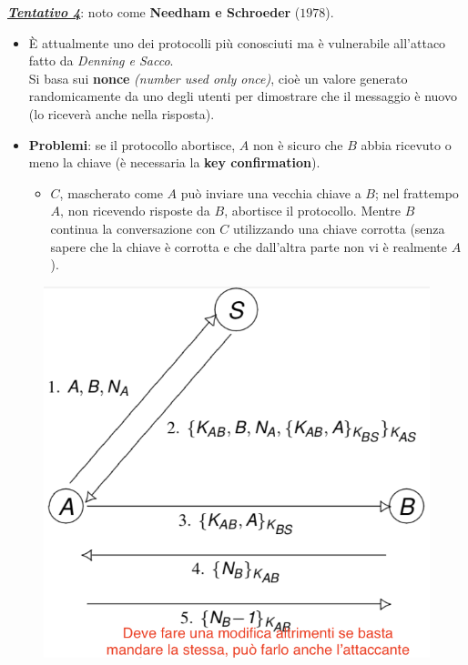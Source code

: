 \documentclass[11pt, a4paper, twoside, italian]{report}
\theoremstyle{plain}
\begin{document}
\begin{multicols}{2}
	\noindent
	\textbf{\textit{\underline{Tentativo 4}}}: noto come \textbf{Needham e Schroeder} ($1978$).
	\begin{itemize}
		\item È attualmente uno dei protocolli più conosciuti ma è vulnerabile all'attaco fatto da \textit{Denning e Sacco}.\\
		Si basa sui \textbf{nonce}\textit{ (number used only once)}, cioè un valore generato randomicamente da uno degli utenti per dimostrare che il messaggio è nuovo (lo riceverà anche nella risposta).
		\item \textbf{Problemi}: se il protocollo abortisce, $A$ non è sicuro che $B$ abbia ricevuto o meno la chiave (è necessaria la \textbf{key confirmation}).
		\begin{itemize}
			\item $C$, mascherato come $A$ può inviare una vecchia chiave a $B$; nel frattempo $A$, non ricevendo risposte da $B$, abortisce il protocollo. Mentre $B$ continua la conversazione con $C$ utilizzando una chiave corrotta (senza sapere che la chiave è corrotta e che dall'altra parte non vi è realmente $A$).
		\end{itemize}
	\end{itemize}
\columnbreak
	\begin{figure}[H]
		\centering
		\includegraphics[scale=0.55]{attempt4}

\end{figure}
\end{multicols}
\end{document}

